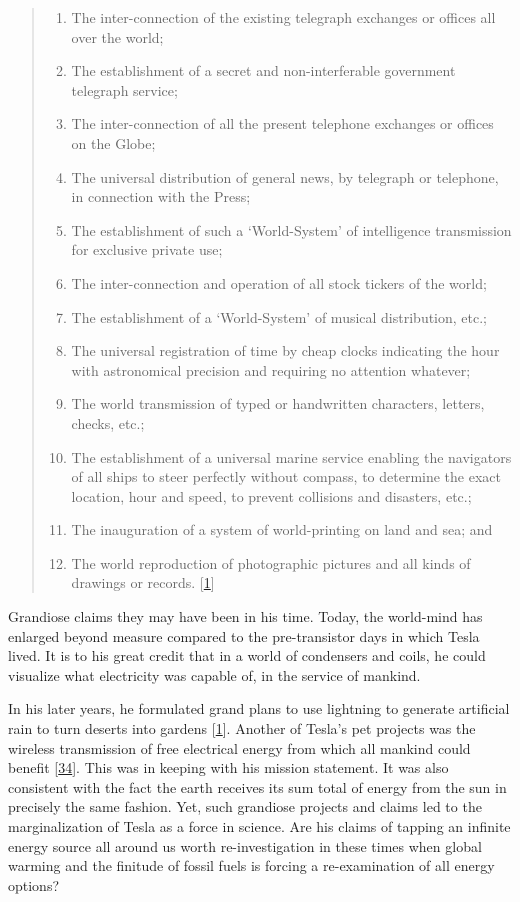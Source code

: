 \documentclass[
  a4paper,
]{article}
\providecommand{\tightlist}{%
  \setlength{\itemsep}{0pt}\setlength{\parskip}{0pt}}
\begin{document}
\begin{quote}
\begin{enumerate}
\tightlist
\item
  The inter-connection of the existing telegraph exchanges or offices
  all over the world;
\item
  The establishment of a secret and non-interferable government
  telegraph service;
\item
  The inter-connection of all the present telephone exchanges or offices
  on the Globe;
\item
  The universal distribution of general news, by telegraph or telephone,
  in connection with the Press;
\item
  The establishment of such a `World-System' of intelligence
  transmission for exclusive private use;
\item
  The inter-connection and operation of all stock tickers of the world;
\item
  The establishment of a `World-System' of musical distribution, etc.;
\item
  The universal registration of time by cheap clocks indicating the hour
  with astronomical precision and requiring no attention whatever;
\item
  The world transmission of typed or handwritten characters, letters,
  checks, etc.;
\item
  The establishment of a universal marine service enabling the
  navigators of all ships to steer perfectly without compass, to
  determine the exact location, hour and speed, to prevent collisions
  and disasters, etc.;
\item
  The inauguration of a system of world-printing on land and sea; and
\item
  The world reproduction of photographic pictures and all kinds of
  drawings or records. {[}\protect\hyperlink{ref-john83}{1}{]}
\end{enumerate}
\end{quote}

Grandiose claims they may have been in his time. Today, the world-mind
has enlarged beyond measure compared to the pre-transistor days in which
Tesla lived. It is to his great credit that in a world of condensers and
coils, he could visualize what electricity was capable of, in the
service of mankind.

In his later years, he formulated grand plans to use lightning to
generate artificial rain to turn deserts into gardens
{[}\protect\hyperlink{ref-john83}{1}{]}. Another of Tesla's pet projects
was the wireless transmission of free electrical energy from which all
mankind could benefit {[}\protect\hyperlink{ref-tesla-energy}{34}{]}.
This was in keeping with his mission statement. It was also consistent
with the fact the earth receives its sum total of energy from the sun in
precisely the same fashion. Yet, such grandiose projects and claims led
to the marginalization of Tesla as a force in science. Are his claims of
tapping an infinite energy source all around us worth re-investigation
in these times when global warming and the finitude of fossil fuels is
forcing a re-examination of all energy options?
\end{document}
